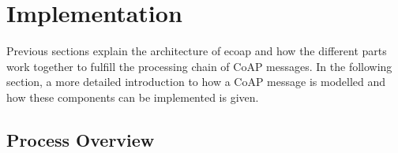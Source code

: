 



\section{Implementation}

Previous sections explain the architecture of ecoap and how the different parts work together to fulfill the processing chain of CoAP messages. In the following section, a more detailed introduction to how a CoAP message is modelled and how these components can be implemented is given.

\subsection{Process Overview}

